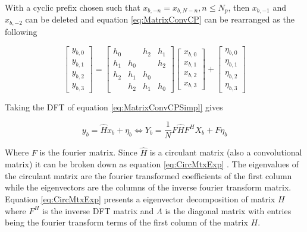 With a cyclic prefix chosen such that $x_{b,-n} = x_{b,N-n}, n \leq N_p $, then $x_{b,-1}$ and $x_{b,-2}$ can be deleted and equation \ref{eq:MatrixConvCP} can be rearranged as the following

\begin{equation}\label{eq:MatrixConvCPSimpl}
    \begin{bmatrix}
        y_{b,0}
        \\ y_{b,1}
        \\ y_{b,2}
        \\ y_{b,3}
    \end{bmatrix}
    = 
    \begin{bmatrix}
        h_0 &  &h_2 & h_1 \\ 
        h_1 & h_0 & & h_2 \\ 
        h_2 & h_1 & h_0 & \\ 
        & h_2 & h_1 & h_0
    \end{bmatrix}
    \begin{bmatrix}
        x_{b,0}
        \\ x_{b,1}
        \\ x_{b,2}
        \\ x_{b,3}
    \end{bmatrix}
    +
    \begin{bmatrix}
        \eta_{b,0}\\ 
        \eta_{b,1}\\ 
        \eta_{b,2}\\ 
        \eta_{b,3}
    \end{bmatrix}
\end{equation}

Taking the DFT of equation \ref{eq:MatrixConvCPSimpl} gives 

\begin{equation}\label{eq:DFTCP}
    y_b = \hat{H}x_b + \eta_{b} \Leftrightarrow Y_b = \frac{1}{N}F\hat{H}F^HX_b + F\eta_{b}
\end{equation}

Where $F$ is the fourier matrix. Since $\hat{H}$ is a circulant matrix (also a convolutional matrix) it can be broken down as equation \ref{eq:CircMtxExp} \cite{CircMatrixStanford}. The eigenvalues of the circulant matrix are the fourier transformed coefficients of the first column while the eigenvectors are the columns of the inverse fourier transform matrix. Equation \ref{eq:CircMtxExp} presents a eigenvector decomposition of matrix $H$ where $F^H$ is the inverse DFT matrix and $\Lambda$ is the diagonal matrix with entries being the fourier transform terms of the first column of the matrix $H$.

